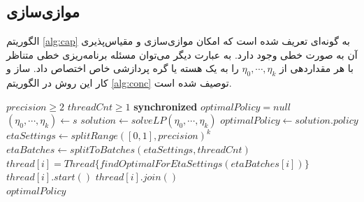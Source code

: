 \subsection{موازی‌سازی}
الگوریتم \ref{alg:cap} به گونه‌ای تعریف شده است که امکان موازی‌سازی و مقیاس‌پذیری آن به صورت خطی وجود دارد. به عبارت دیگر می‌توان مسئله برنامه‌ریزی خطی متناظر با هر مقداردهی از
$\eta_0, \cdots, \eta_k$
را به یک هسته یا گره پردازشی خاص اختصاص داد. ساز و کار این روش در الگوریتم \ref{alg:conc} توصیف شده است.
\begin{latin}
	\begin{algorithm}
		\begin{algorithmic}[1]
			\Require $precision \geq 2$
			\Require $threadCnt \geq 1$
			\State \textbf{synchronized} $optimalPolicy = null$
			\State $(\eta_0, \cdots, \eta_k) \gets s$
			\State $solution \gets solveLP(\eta_0, \cdots, \eta_k)$
			\State $optimalPolicy \gets solution.policy$
			\EndIf
			\EndFor
			\EndProcedure
			\State $etaSettings \gets splitRange([0, 1], precision)^k$
			\State $etaBatches \gets splitToBatches(etaSettings, threadCnt)$
			\State \(thread[i] = Thread\{findOptimalForEtaSettings(etaBatches[i])\}\)
			\EndFor
			\State $thread[i].start()$
			\EndFor
			\State $thread[i].join()$
			\EndFor \\
			\Return $optimalPolicy$
		\end{algorithmic}
	\end{algorithm}
\end{latin}
